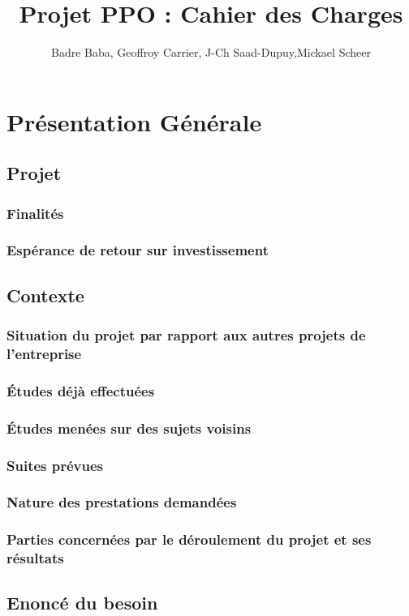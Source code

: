 \documentclass[10pt,a4paper]{article}
\title{Projet PPO : Cahier des Charges}
\author{
	Badre Baba, Geoffroy Carrier, J-Ch Saad-Dupuy,Mickael Scheer
}
\begin{document}
\maketitle

\section{Présentation Générale}
\subsection{Projet}
\subsubsection{Finalités}
\subsubsection{Espérance de retour sur investissement}

\subsection{Contexte}
\subsubsection{Situation du projet par rapport aux autres projets de l’entreprise}
\subsubsection{Études déjà effectuées}
\subsubsection{Études menées sur des sujets voisins}
\subsubsection{Suites prévues}
\subsubsection{Nature des prestations demandées}
\subsubsection{Parties concernées par le déroulement du projet et ses résultats}

\subsection{Enoncé du besoin}
\end{document}
